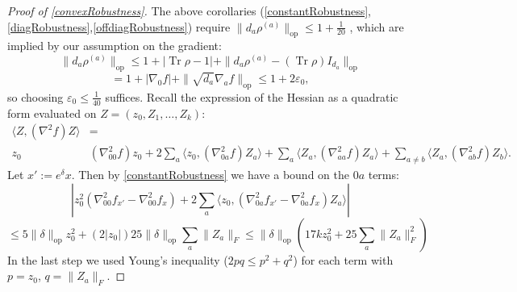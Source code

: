 \documentclass[aos]{imsart}
\theoremstyle{definition}
\numberwithin{equation}{section}
\DeclareMathOperator{\op}{op}
\DeclareMathOperator{\tr}{Tr}
\newcommand{\eps}{\varepsilon}
\newcommand{\samp}{x}
\begin{document}
\begin{appendix}
\begin{proof} [Proof of \cref{convexRobustness}]
The above corollaries (\ref{constantRobustness},\ref{diagRobustness},\ref{offdiagRobustness}) require $\|d_{a} \rho^{(a)}\|_{\op} \leq 1 + \frac{1}{20}$ , which are implied by our assumption on the gradient:
\[ \|d_{a} \rho^{(a)}\|_{\op} \leq 1 + |\tr \rho - 1| + \|d_{a} \rho^{(a)} - (\tr \rho) I_{d_{a}} \|_{\op}    \]
\[ = 1 + |\nabla_{0} f| + \|\sqrt{d_{a}} \nabla_{a} f\|_{\op} \leq 1 + 2 \eps_0 ,    \]
 so choosing $\eps_0 \leq \frac{1}{40}$ suffices.
Recall the expression of the Hessian as a quadratic form evaluated on $Z = (z_0, Z_1, \dots, Z_k):$
\begin{align*} \langle Z, (\nabla^{2} f) Z \rangle&=\\
  z_{0} &(\nabla^{2}_{00} f) z_{0} + 2 \sum_{a} \langle z_{0}, (\nabla^{2}_{0a} f) Z_{a} \rangle + \sum_{a} \langle Z_{a}, (\nabla^{2}_{aa} f) Z_{a} \rangle + \sum_{a \neq b} \langle Z_{a}, (\nabla^{2}_{ab} f) Z_{b} \rangle .  \end{align*}
Let $\samp' := e^{\delta} \samp$. Then by \cref{constantRobustness} we have a bound on the $0a$ terms:
\[ | z_{0}^{2} (\nabla^{2}_{00} f_{\samp'} - \nabla^{2}_{00} f_{\samp} ) + 2 \sum_{a} \langle z_{0}, (\nabla^{2}_{0a} f_{\samp'} - \nabla^{2}_{0a} f_{\samp}) Z_{a} \rangle |      \]
\[ \leq 5 \|\delta\|_{\op} z_{0}^{2} + (2 |z_{0}|) 25 \|\delta\|_{\op} \sum_{a} \|Z_{a}\|_{F}
\leq \|\delta\|_{\op} (17 k z_{0}^{2} + 25 \sum_{a} \|Z_{a}\|_{F}^{2})   \]
In the last step we used Young's inequality ($2pq \leq p^{2} + q^{2}$) for each term with $p = z_0$, $q = \|Z_{a}\|_F$.


\end{proof}
\end{appendix}
\end{document}

